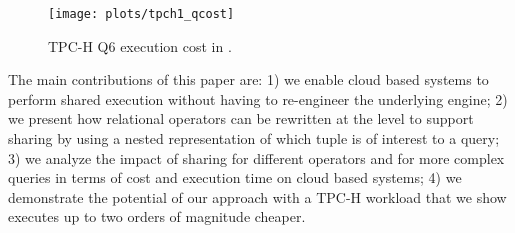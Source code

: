 \begin{figure}[t]
    \texttt{[image: plots/tpch1\_qcost]}
    \centering
    \caption{TPC-H Q6 execution cost in \athena.}
    \label{fig:in:tpch6_qcost}
\end{figure} 

The main contributions of this paper are: 1) we enable 
cloud based \qaasl systems to perform shared execution without having to
re-engineer the underlying engine; 2) we present how relational operators
can be rewritten at the \sql level to support sharing by using a nested
representation of which tuple is of interest to a query; 3) we analyze the impact
of sharing for different operators and for more complex queries in terms of cost
and execution time on cloud based \qaasl systems; 4) we demonstrate the
potential of our approach with a TPC-H workload that we show executes 
up to two orders of magnitude
cheaper.

